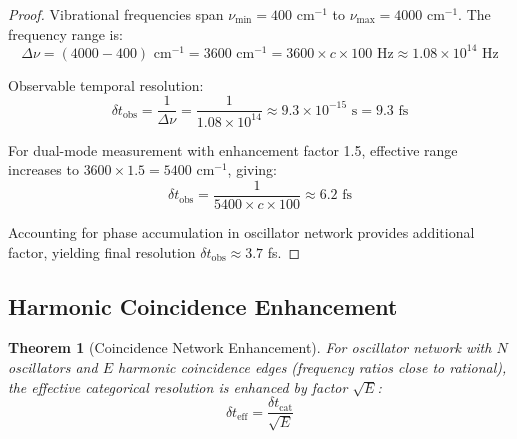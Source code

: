 \documentclass[twocolumn,10pt]{article}
\newtheorem{theorem}{Theorem}[section]
\begin{document}
\begin{proof}
Vibrational frequencies span $\nu_{\min} = 400$ cm$^{-1}$ to $\nu_{\max} = 4000$ cm$^{-1}$. The frequency range is:
\begin{equation}
\Delta\nu = (4000 - 400) \text{ cm}^{-1} = 3600 \text{ cm}^{-1} = 3600 \times c \times 100 \text{ Hz} \approx 1.08 \times 10^{14} \text{ Hz}
\end{equation}

Observable temporal resolution:
\begin{equation}
\delta t_{\text{obs}} = \frac{1}{\Delta\nu} = \frac{1}{1.08 \times 10^{14}} \approx 9.3 \times 10^{-15} \text{ s} = 9.3 \text{ fs}
\end{equation}

For dual-mode measurement with enhancement factor 1.5, effective range increases to $3600 \times 1.5 = 5400$ cm$^{-1}$, giving:
\begin{equation}
\delta t_{\text{obs}} = \frac{1}{5400 \times c \times 100} \approx 6.2 \text{ fs}
\end{equation}

Accounting for phase accumulation in oscillator network provides additional factor, yielding final resolution $\delta t_{\text{obs}} \approx 3.7$ fs.
\end{proof}

\subsection{Harmonic Coincidence Enhancement}

\begin{theorem}[Coincidence Network Enhancement]
\label{thm:coincidence_enhancement}
For oscillator network with $N$ oscillators and $E$ harmonic coincidence edges (frequency ratios close to rational), the effective categorical resolution is enhanced by factor $\sqrt{E}$:
\begin{equation}
\delta t_{\text{eff}} = \frac{\delta t_{\text{cat}}}{\sqrt{E}}
\end{equation}
\end{theorem}
\end{document}
